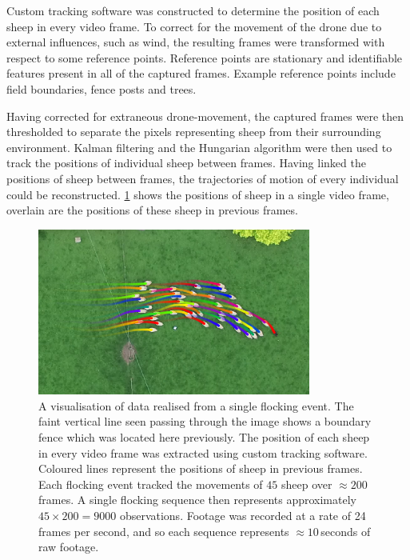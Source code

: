Custom tracking software was constructed to determine the position of each
sheep in every video frame. To correct for the movement of the drone due to
external influences, such as wind, the resulting frames were transformed with
respect to some reference points. Reference points are stationary and
identifiable features present in all of the captured frames. Example reference
points include field boundaries, fence posts and trees.

Having corrected for extraneous drone-movement, the captured frames were then
thresholded to separate the pixels representing sheep from their surrounding
environment. Kalman filtering and the Hungarian algorithm were then used to
track the positions of individual sheep between frames. Having linked the
positions of sheep between frames, the trajectories of motion of every
individual could be reconstructed. \cref{fig:sheep_frame} shows the positions
of sheep in a single video frame, overlain are the positions of these sheep in
previous frames.

\begin{figure}[tbp]
  \includegraphics[width=0.8\textwidth]{traj0130_crop.png}
  \caption{A visualisation of data realised from a single flocking event. The
    faint vertical line seen passing through the image shows a boundary fence
    which was located here previously. The position of each sheep in every
    video frame was extracted using custom tracking software. Coloured lines
    represent the positions of sheep in previous frames. Each flocking event
    tracked the movements of $45$ sheep over $\approx200$ frames. A single
    flocking sequence then represents approximately $45\times200=9000$
    observations. Footage was recorded at a rate of 24 frames per second, and so
    each sequence represents $\approx10$\,seconds of raw footage.}
  \label{fig:sheep_frame}
\end{figure}

